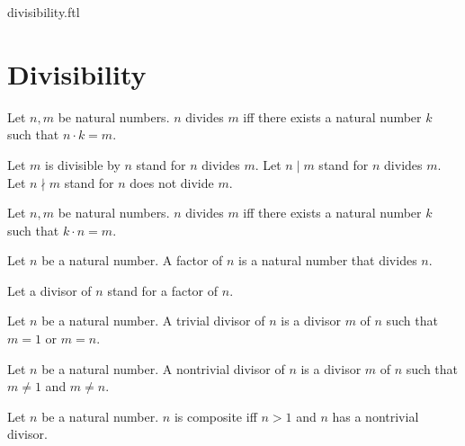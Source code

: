 \documentclass{naproche-library}
\begin{document}
\begin{smodule}{divisibility.ftl}

  \section*{Divisibility}

  \begin{definition}[forthel,id=ARITHMETIC_07_4239998993825792,printid]
    Let $n, m$ be natural numbers.
    $n$ divides $m$ iff there exists a natural number $k$ such that $n \cdot k = m$.

    Let $m$ is divisible by $n$ stand for $n$ divides $m$.
    Let $n \mid m$ stand for $n$ divides $m$.
    Let $n \nmid m$ stand for $n$ does not divide $m$.
  \end{definition}

  \begin{lemma}[forthel,id=ARITHMETIC_07_1478855118290944,printid]
    Let $n, m$ be natural numbers.
    $n$ divides $m$ iff there exists a natural number $k$ such that $k \cdot n = m$.
  \end{lemma}

  \begin{definition}[forthel,id=ARITHMETIC_07_1311437490225152,printid]
    Let $n$ be a natural number.
    A factor of $n$ is a natural number that divides $n$.

    Let a divisor of $n$ stand for a factor of $n$.
  \end{definition}

  \begin{definition}[forthel,id=ARITHMETIC_10_5438991513944064,printid]
    Let $n$ be a natural number.
    A trivial divisor of $n$ is a divisor $m$ of $n$ such that $m = 1$ or $m = n$.
  \end{definition}

  \begin{definition}[forthel,id=ARITHMETIC_10_8768240253665280,printid]
    Let $n$ be a natural number.
    A nontrivial divisor of $n$ is a divisor $m$ of $n$ such that $m \neq 1$ and $m \neq n$.
  \end{definition}

  \begin{definition}[forthel,id=ARITHMETIC_10_8020087063707648,printid]
    Let $n$ be a natural number.
    $n$ is composite iff $n > 1$ and $n$ has a nontrivial divisor.
  \end{definition}


\end{smodule}
\end{document}
